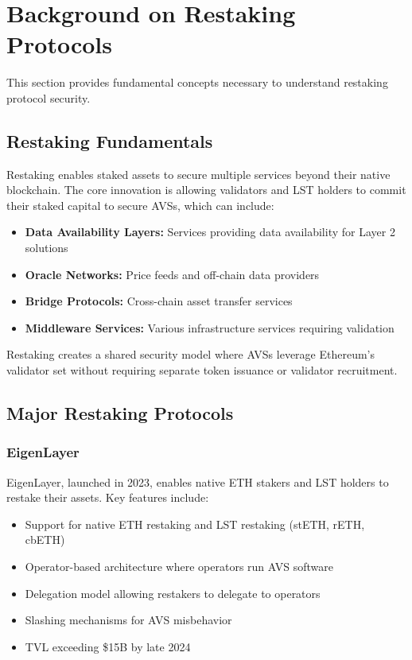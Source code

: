 \documentclass[runningheads]{llncs}
\begin{document}
\section{Background on Restaking Protocols}
\label{sec:background}

This section provides fundamental concepts necessary to understand restaking protocol security.

\subsection{Restaking Fundamentals}

Restaking enables staked assets to secure multiple services beyond their native blockchain. The core innovation is allowing validators and LST holders to commit their staked capital to secure AVSs, which can include:

\begin{itemize}
    \item \textbf{Data Availability Layers:} Services providing data availability for Layer 2 solutions
    \item \textbf{Oracle Networks:} Price feeds and off-chain data providers
    \item \textbf{Bridge Protocols:} Cross-chain asset transfer services
    \item \textbf{Middleware Services:} Various infrastructure services requiring validation
\end{itemize}

Restaking creates a shared security model where AVSs leverage Ethereum's validator set without requiring separate token issuance or validator recruitment.

\subsection{Major Restaking Protocols}

\subsubsection{EigenLayer}

EigenLayer, launched in 2023, enables native ETH stakers and LST holders to restake their assets. Key features include:
\begin{itemize}
    \item Support for native ETH restaking and LST restaking (stETH, rETH, cbETH)
    \item Operator-based architecture where operators run AVS software
    \item Delegation model allowing restakers to delegate to operators
    \item Slashing mechanisms for AVS misbehavior
    \item TVL exceeding \$15B by late 2024
\end{itemize}
\end{document}
